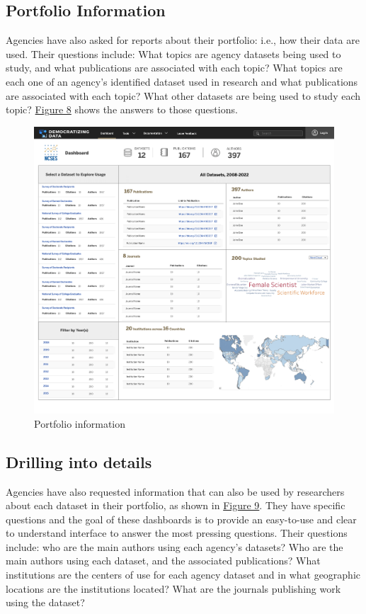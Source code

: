 \documentclass[titlepage, 11pt]{article}
\begin{document}
{\subsection{Portfolio Information}
Agencies have also asked for reports about their portfolio: i.e., how their data are used.   Their questions include: What topics are agency datasets being used to study, and what publications are associated with each topic? What topics are each one of an agency’s identified dataset used in research and what publications are associated with each topic? What other datasets are being used to study each topic?  \hyperref[fig:review]{Figure 8} shows the answers to those questions.
\begin{figure}
\centering
  \includegraphics[scale=0.30]{portfolio.png}
  \caption{Portfolio information}
  \label{fig:portfolio}
\end{figure}

\subsection{Drilling into details}
Agencies have also requested information that can also be used by researchers about each dataset in their portfolio, as shown in \hyperref[fig:items_per_page]{Figure 9}.  They have specific questions and the goal of these dashboards is to provide an easy-to-use and clear to understand interface to answer the most pressing questions. Their questions include: who are the main authors using each agency’s datasets?  Who are the main authors using each dataset, and the associated publications? What institutions are the centers of use for each agency dataset and in what geographic locations are the institutions located?  What are the journals publishing work using the dataset?

}
\end{document}
